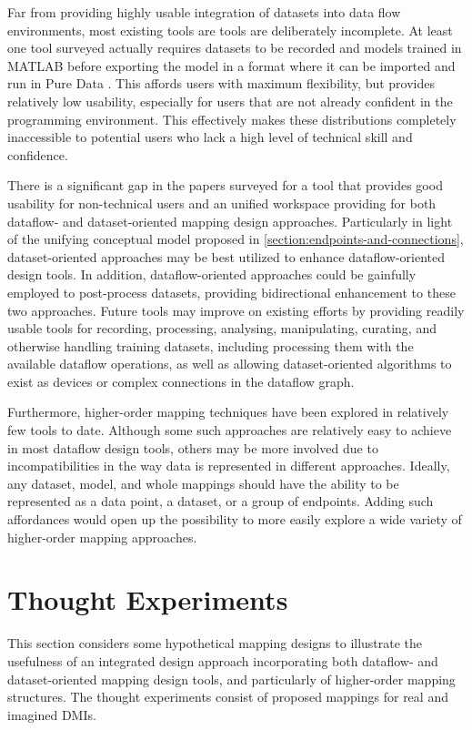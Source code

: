 \documentclass[main.tex]{subfiles}
\begin{document}
Far from providing highly usable integration of datasets into data flow environments,
most existing tools are tools are
deliberately incomplete.  At least one tool surveyed actually requires
datasets to be recorded and models trained in MATLAB before exporting the model
in a format where it can be imported and run in Pure Data
\cite{cont2004pd-ann}.  This affords users with maximum flexibility, but
provides relatively low usability, especially for users that are not already
confident in the programming environment.  This effectively makes these
distributions completely inaccessible to potential users who lack a high level
of technical skill and confidence.

There is a significant gap in the papers surveyed for a tool that provides good
usability for non-technical users and an unified workspace providing for both
dataflow- and dataset-oriented mapping design approaches.  Particularly in
light of the unifying conceptual model proposed in
\cref{section:endpoints-and-connections}, dataset-oriented approaches may be
best utilized to enhance dataflow-oriented design tools.  In addition, dataflow-oriented
approaches could be gainfully employed to post-process datasets, providing bidirectional
enhancement to these two approaches. Future tools may
improve on existing efforts by providing readily usable tools for recording, processing, analysing,
manipulating, curating, and otherwise handling training datasets, including
processing them with the available dataflow operations, as well as allowing
dataset-oriented algorithms to exist as devices or complex connections in the dataflow graph.

Furthermore, higher-order mapping techniques have been explored in relatively
few tools to date.  Although some such approaches are relatively easy to
achieve in most dataflow design tools, others may be more involved due to
incompatibilities in the way data is represented in different approaches.
Ideally, any dataset, model, and whole mappings should have the ability to be
represented as a data point, a dataset, or a group of endpoints.  Adding such
affordances would open up the possibility to more easily explore a wide variety
of higher-order mapping approaches.

\section{Thought Experiments}

This section considers some hypothetical mapping designs to illustrate the usefulness
of an integrated design approach incorporating both dataflow- and dataset-oriented
mapping design tools, and particularly of higher-order mapping structures.
The thought experiments consist of proposed mappings
for real and imagined DMIs.
\end{document}
